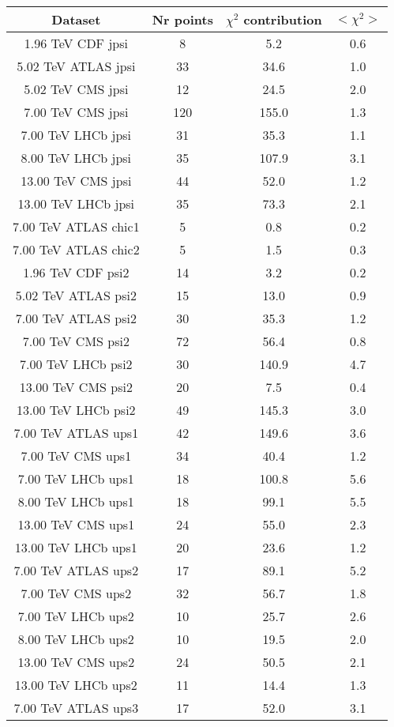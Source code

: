 \begin{table}[h!]
\centering
\begin{tabular}{c|c|c|c}
Dataset & Nr points & $\chi^2$ contribution & $<\chi^2>$ \\
\hline
1.96 TeV CDF jpsi & 8 & 5.2 & 0.6 \\
5.02 TeV ATLAS jpsi & 33 & 34.6 & 1.0 \\
5.02 TeV CMS jpsi & 12 & 24.5 & 2.0 \\
7.00 TeV CMS jpsi & 120 & 155.0 & 1.3 \\
7.00 TeV LHCb jpsi & 31 & 35.3 & 1.1 \\
8.00 TeV LHCb jpsi & 35 & 107.9 & 3.1 \\
13.00 TeV CMS jpsi & 44 & 52.0 & 1.2 \\
13.00 TeV LHCb jpsi & 35 & 73.3 & 2.1 \\
7.00 TeV ATLAS chic1 & 5 & 0.8 & 0.2 \\
7.00 TeV ATLAS chic2 & 5 & 1.5 & 0.3 \\
1.96 TeV CDF psi2 & 14 & 3.2 & 0.2 \\
5.02 TeV ATLAS psi2 & 15 & 13.0 & 0.9 \\
7.00 TeV ATLAS psi2 & 30 & 35.3 & 1.2 \\
7.00 TeV CMS psi2 & 72 & 56.4 & 0.8 \\
7.00 TeV LHCb psi2 & 30 & 140.9 & 4.7 \\
13.00 TeV CMS psi2 & 20 & 7.5 & 0.4 \\
13.00 TeV LHCb psi2 & 49 & 145.3 & 3.0 \\
7.00 TeV ATLAS ups1 & 42 & 149.6 & 3.6 \\
7.00 TeV CMS ups1 & 34 & 40.4 & 1.2 \\
7.00 TeV LHCb ups1 & 18 & 100.8 & 5.6 \\
8.00 TeV LHCb ups1 & 18 & 99.1 & 5.5 \\
13.00 TeV CMS ups1 & 24 & 55.0 & 2.3 \\
13.00 TeV LHCb ups1 & 20 & 23.6 & 1.2 \\
7.00 TeV ATLAS ups2 & 17 & 89.1 & 5.2 \\
7.00 TeV CMS ups2 & 32 & 56.7 & 1.8 \\
7.00 TeV LHCb ups2 & 10 & 25.7 & 2.6 \\
8.00 TeV LHCb ups2 & 10 & 19.5 & 2.0 \\
13.00 TeV CMS ups2 & 24 & 50.5 & 2.1 \\
13.00 TeV LHCb ups2 & 11 & 14.4 & 1.3 \\
7.00 TeV ATLAS ups3 & 17 & 52.0 & 3.1 \\

\end{tabular}
\end{table}
